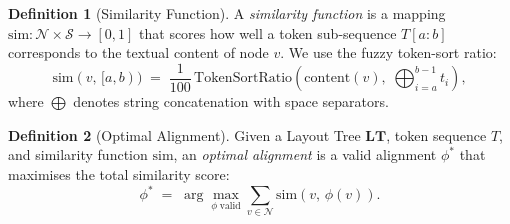 \documentclass{article}
\theoremstyle{definition}
\newtheorem{definition}{Definition}[section]
\newcommand{\LT}{\mathbf{LT}}
\newcommand{\Nodes}{\mathcal{N}}
\newcommand{\Spans}{\mathcal{S}}
\begin{document}
\begin{definition}[Similarity Function]
  A \emph{similarity function} is a mapping
  $\mathrm{sim} : \Nodes \times \Spans \to [0, 1]$
  that scores how well a token sub-sequence $T[a:b]$ corresponds to the
  textual content of node $v$.  We use the fuzzy token-sort ratio:
  \[
    \mathrm{sim}(v,\,[a,b))
    \;=\;
    \frac{1}{100}\,
    \mathrm{TokenSortRatio}\!\left(\mathrm{content}(v),\;
    \textstyle\bigoplus_{i=a}^{b-1} t_i\right),
  \]
  where $\bigoplus$ denotes string concatenation with space separators.
\end{definition}

\begin{definition}[Optimal Alignment]
  Given a Layout Tree $\LT$, token sequence $T$, and similarity function
  $\mathrm{sim}$, an \emph{optimal alignment} is a valid alignment
  $\phi^{*}$ that maximises the total similarity score:
  \[
    \phi^{*} \;=\;
    \arg\max_{\phi \;\text{valid}}
    \sum_{v \in \Nodes} \mathrm{sim}\!\left(v,\, \phi(v)\right).
  \]
\end{definition}
\end{document}
